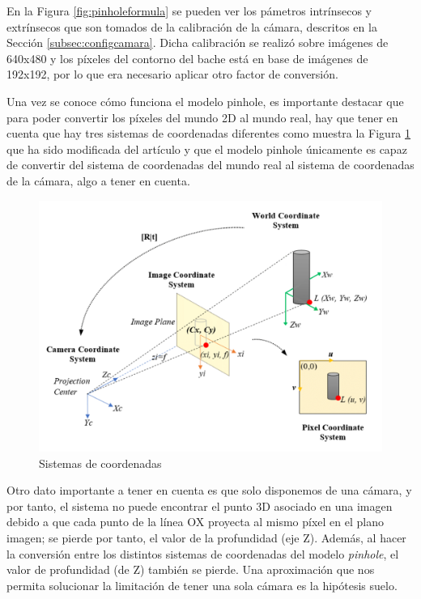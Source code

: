 En la Figura \ref{fig:pinholeformula} se pueden ver los pámetros intrínsecos y extrínsecos que son tomados de la calibración de la cámara, descritos en la Sección \ref{subsec:configcamara}. Dicha calibración se realizó sobre imágenes de 640x480 y los píxeles del contorno del bache está en base de imágenes de 192x192, por lo que era necesario aplicar otro factor de conversión. 

Una vez se conoce cómo funciona el modelo pinhole, es importante destacar que para poder convertir los píxeles del mundo 2D al mundo real, hay que tener en cuenta que hay tres sistemas de coordenadas diferentes como muestra la Figura \ref{fig:siscoordenadas} que ha sido modificada del artículo \cite{unknown} y que el modelo pinhole únicamente es capaz de convertir del sistema de coordenadas del mundo real al sistema de coordenadas de la cámara, algo a tener en cuenta.  

 \begin{figure} [h!]
	\begin{center}
		\includegraphics[width=15cm]{figs/cap6/pinholecoordinates.png}
	\end{center}
	\caption{Sistemas de coordenadas}
	\label{fig:siscoordenadas}
\end{figure}

Otro dato importante a tener en cuenta es que solo disponemos de una cámara, y por tanto, el sistema no puede encontrar el punto 3D asociado en una imagen debido a que cada punto de la línea OX proyecta al mismo píxel en el plano imagen; se pierde por tanto, el valor de la profundidad (eje Z). Además, al hacer la conversión entre los distintos sistemas de coordenadas del modelo \textit{pinhole}, el valor de profundidad (de Z) también se pierde. Una aproximación que nos permita solucionar la limitación de tener una sola cámara es la hipótesis suelo. 

